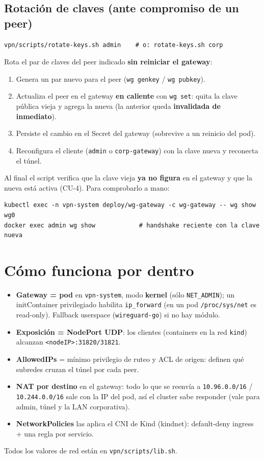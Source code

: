 \documentclass[11pt,a4paper]{article}
\newcommand{\cmd}[1]{\texttt{#1}}
\begin{document}
\subsection{Rotación de claves (ante compromiso de un peer)}
\begin{lstlisting}
vpn/scripts/rotate-keys.sh admin    # o: rotate-keys.sh corp
\end{lstlisting}
Rota el par de claves del peer indicado \textbf{sin reiniciar el gateway}:
\begin{enumerate}
  \item Genera un par nuevo para el peer (\cmd{wg genkey} / \cmd{wg pubkey}).
  \item Actualiza el peer en el gateway \textbf{en caliente} con \cmd{wg set}:
        quita la clave pública vieja y agrega la nueva (la anterior queda
        \textbf{invalidada de inmediato}).
  \item Persiste el cambio en el Secret del gateway (sobrevive a un reinicio
        del pod).
  \item Reconfigura el cliente (\cmd{admin} o \cmd{corp-gateway}) con la clave
        nueva y reconecta el túnel.
\end{enumerate}
Al final el script verifica que la clave vieja \textbf{ya no figura} en el
gateway y que la nueva está activa (CU-4). Para comprobarlo a mano:
\begin{lstlisting}
kubectl exec -n vpn-system deploy/wg-gateway -c wg-gateway -- wg show wg0
docker exec admin wg show            # handshake reciente con la clave nueva
\end{lstlisting}

\section{Cómo funciona por dentro}
\begin{itemize}
  \item \textbf{Gateway = pod} en \cmd{vpn-system}, modo \textbf{kernel} (sólo
        \cmd{NET\_ADMIN}); un initContainer privilegiado habilita
        \cmd{ip\_forward} (en un pod \cmd{/proc/sys/net} es read-only). Fallback
        userspace (\cmd{wireguard-go}) si no hay módulo.
  \item \textbf{Exposición = NodePort UDP}: los clientes (containers en la red
        \cmd{kind}) alcanzan \cmd{<nodeIP>:31820/31821}.
  \item \textbf{AllowedIPs} = mínimo privilegio de ruteo y ACL de origen: definen
        qué subredes cruzan el túnel por cada peer.
  \item \textbf{NAT por destino} en el gateway: todo lo que se reenvía a
        \cmd{10.96.0.0/16} / \cmd{10.244.0.0/16} sale con la IP del pod, así el
        cluster sabe responder (vale para admin, túnel y la LAN corporativa).
  \item \textbf{NetworkPolicies} las aplica el CNI de Kind (kindnet): default-deny
        ingress + una regla por servicio.
\end{itemize}
\noindent Todos los valores de red están en \cmd{vpn/scripts/lib.sh}.
\end{document}
